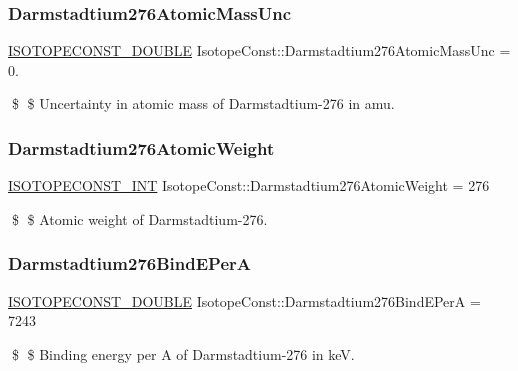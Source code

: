 \subsubsection{\texorpdfstring{Darmstadtium276\+Atomic\+Mass\+Unc}{Darmstadtium276AtomicMassUnc}}
{\footnotesize\ttfamily \mbox{\hyperlink{group___isotope_const-_macros_ga8f45a7272ce02c0b4c65c44636ed719a}{I\+S\+O\+T\+O\+P\+E\+C\+O\+N\+S\+T\+\_\+\+D\+O\+U\+B\+LE}} Isotope\+Const\+::\+Darmstadtium276\+Atomic\+Mass\+Unc = 0.}

\$ \$ Uncertainty in atomic mass of Darmstadtium-\/276 in amu. \mbox{\label{group___isotope_const-_darmstadtium-_ds276_ga52fdf8a83e9e145a94b65f3edf540abe}} 
\subsubsection{\texorpdfstring{Darmstadtium276\+Atomic\+Weight}{Darmstadtium276AtomicWeight}}
{\footnotesize\ttfamily \mbox{\hyperlink{group___isotope_const-_macros_ga5f18360b3e99483a35c32d789e62621c}{I\+S\+O\+T\+O\+P\+E\+C\+O\+N\+S\+T\+\_\+\+I\+NT}} Isotope\+Const\+::\+Darmstadtium276\+Atomic\+Weight = 276}

\$ \$ Atomic weight of Darmstadtium-\/276. \mbox{\label{group___isotope_const-_darmstadtium-_ds276_gaaac24efcaca5672ff63538916edaf974}} 
\subsubsection{\texorpdfstring{Darmstadtium276\+Bind\+E\+PerA}{Darmstadtium276BindEPerA}}
{\footnotesize\ttfamily \mbox{\hyperlink{group___isotope_const-_macros_ga8f45a7272ce02c0b4c65c44636ed719a}{I\+S\+O\+T\+O\+P\+E\+C\+O\+N\+S\+T\+\_\+\+D\+O\+U\+B\+LE}} Isotope\+Const\+::\+Darmstadtium276\+Bind\+E\+PerA = 7243}

\$ \$ Binding energy per A of Darmstadtium-\/276 in keV. \mbox{\label{group___isotope_const-_darmstadtium-_ds276_gafdb3a72205c0ff4ddec439f1af0f5308}} 

